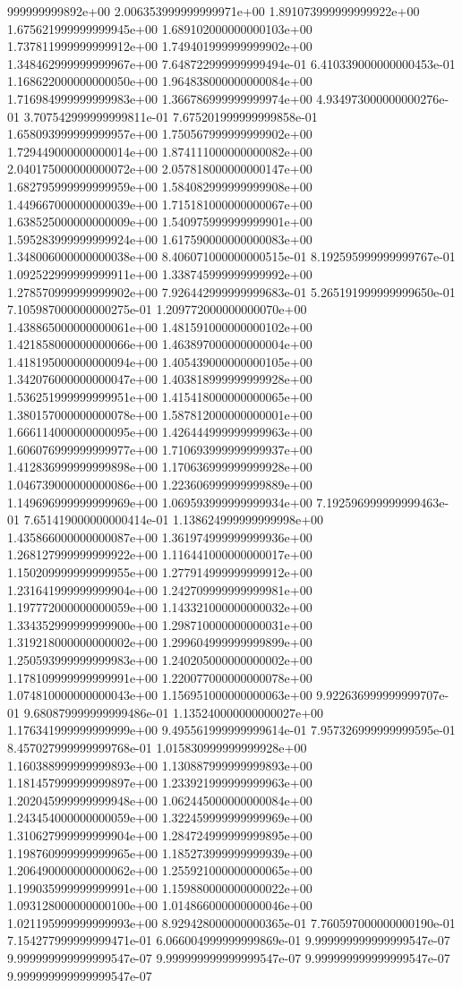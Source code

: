 999999999892e+00	2.006353999999999971e+00	1.891073999999999922e+00	1.675621999999999945e+00	1.689102000000000103e+00	1.737811999999999912e+00	1.749401999999999902e+00	1.348462999999999967e+00	7.648722999999999494e-01	6.410339000000000453e-01	1.168622000000000050e+00	1.964838000000000084e+00	1.716984999999999983e+00	1.366786999999999974e+00	4.934973000000000276e-01	3.707542999999999811e-01	7.675201999999999858e-01	1.658093999999999957e+00	1.750567999999999902e+00	1.729449000000000014e+00	1.874111000000000082e+00	2.040175000000000072e+00	2.057818000000000147e+00	1.682795999999999959e+00	1.584082999999999908e+00	1.449667000000000039e+00	1.715181000000000067e+00	1.638525000000000009e+00	1.540975999999999901e+00	1.595283999999999924e+00	1.617590000000000083e+00	1.348006000000000038e+00	8.406071000000000515e-01	8.192595999999999767e-01	1.092522999999999911e+00	1.338745999999999992e+00	1.278570999999999902e+00	7.926442999999999683e-01	5.265191999999999650e-01	7.105987000000000275e-01	1.209772000000000070e+00	1.438865000000000061e+00	1.481591000000000102e+00	1.421858000000000066e+00	1.463897000000000004e+00	1.418195000000000094e+00	1.405439000000000105e+00	1.342076000000000047e+00	1.403818999999999928e+00	1.536251999999999951e+00	1.415418000000000065e+00	1.380157000000000078e+00	1.587812000000000001e+00	1.666114000000000095e+00	1.426444999999999963e+00	1.606076999999999977e+00	1.710693999999999937e+00	1.412836999999999898e+00	1.170636999999999928e+00	1.046739000000000086e+00	1.223606999999999889e+00	1.149696999999999969e+00	1.069593999999999934e+00	7.192596999999999463e-01	7.651419000000000414e-01	1.138624999999999998e+00	1.435866000000000087e+00	1.361974999999999936e+00	1.268127999999999922e+00	1.116441000000000017e+00	1.150209999999999955e+00	1.277914999999999912e+00	1.231641999999999904e+00	1.242709999999999981e+00	1.197772000000000059e+00	1.143321000000000032e+00	1.334352999999999900e+00	1.298710000000000031e+00	1.319218000000000002e+00	1.299604999999999899e+00	1.250593999999999983e+00	1.240205000000000002e+00	1.178109999999999991e+00	1.220077000000000078e+00	1.074810000000000043e+00	1.156951000000000063e+00	9.922636999999999707e-01	9.680879999999999486e-01	1.135240000000000027e+00	1.176341999999999999e+00	9.495561999999999614e-01	7.957326999999999595e-01	8.457027999999999768e-01	1.015830999999999928e+00	1.160388999999999893e+00	1.130887999999999893e+00	1.181457999999999897e+00	1.233921999999999963e+00	1.202045999999999948e+00	1.062445000000000084e+00	1.243454000000000059e+00	1.322459999999999969e+00	1.310627999999999904e+00	1.284724999999999895e+00	1.198760999999999965e+00	1.185273999999999939e+00	1.206490000000000062e+00	1.255921000000000065e+00	1.199035999999999991e+00	1.159880000000000022e+00	1.093128000000000100e+00	1.014866000000000046e+00	1.021195999999999993e+00	8.929428000000000365e-01	7.760597000000000190e-01	7.154277999999999471e-01	6.066004999999999869e-01	9.999999999999999547e-07	9.999999999999999547e-07	9.999999999999999547e-07	9.999999999999999547e-07	9.999999999999999547e-07
